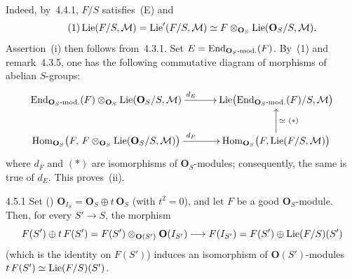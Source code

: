 Indeed, by~4.4.1, \(F/S\) satisfies~(E) and
\begin{equation}
\tag{1}
\operatorname{Lie}(F/S,\mathcal{M})
=
\operatorname{Lie}'(F/S,\mathcal{M})
\simeq
F\otimes_{\mathbf{O}_{S}}\operatorname{Lie}(\mathbf{O}_{S}/S,\mathcal{M}).
\end{equation}
Assertion~(i) then follows from~4.3.1. Set
\(E=\operatorname{End}_{\mathbf{O}_{S}\text{-mod.}}(F)\). By~(1) and remark~4.3.5, one has
the following commutative diagram of morphisms of abelian \(S\)-groups:
\[
\xymatrix@C=3.2em{
\End_{\mathbf{O}_{S}\text{-mod.}}(F)
  \otimes_{\mathbf{O}_{S}}\Lie(\mathbf{O}_{S}/S,\mathcal{M})
  \ar[r]^{d_{E}}
&
\Lie\bigl(\End_{\mathbf{O}_{S}\text{-mod.}}(F)/S,\mathcal{M}\bigr)
\\
\Hom_{\mathbf{O}_{S}}\bigl(F,\,
  F\otimes_{\mathbf{O}_{S}}\Lie(\mathbf{O}_{S}/S,\mathcal{M})\bigr)
  \ar[r]^{d_{F}}
&
\Hom_{\mathbf{O}_{S}}\bigl(F,\Lie(F/S,\mathcal{M})\bigr)
  \ar[u]_{\simeq\ (*)}
}
\]
where \(d_{F}\) and \((*)\) are isomorphisms of \(\mathbf{O}_{S}\)-modules;
consequently, the same is true of \(d_{E}\). This proves~(ii).

\begin{scholium}{4.5.1}\label{II.4.5.1}
{\renewcommand{\thefootnote}{(72)}}
Set () \(\mathbf{O}_{I_{S}}=\mathbf{O}_{S}\oplus t\,\mathbf{O}_{S}\)
(with \(t^{2}=0\)), and let \(F\) be a good \(\mathbf{O}_{S}\)-module. Then,
for every \(S'\to S\), the morphism
\[
F(S')\oplus t\,F(S')
=
F(S')\otimes_{\mathbf{O}(S')}\mathbf{O}(I_{S'})
\longrightarrow
F(I_{S'})
=
F(S')\oplus\operatorname{Lie}(F/S)(S')
\]
(which is the identity on \(F(S')\)) induces an isomorphism of
\(\mathbf{O}(S')\)-modules
\(t\,F(S')\simeq\operatorname{Lie}(F/S)(S')\).
\end{scholium}
